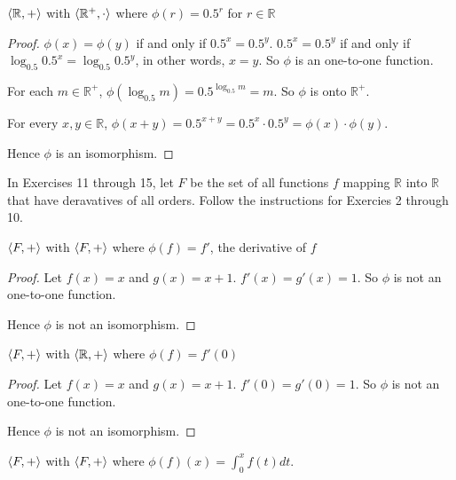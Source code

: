 \begin{exercise}
    $\left\langle{\mathbb{R}, +}\right\rangle$ with $\left\langle{\mathbb{R}^{+},\cdot}\right\rangle$ where $\phi(r) = {0.5}^{r}$ for $r\in\mathbb{R}$
\end{exercise}

\begin{proof}
    $\phi(x) = \phi(y)$ if and only if ${0.5}^{x} = {0.5}^{y}$. ${0.5}^{x} = {0.5}^{y}$ if and only if $\log_{0.5}{0.5}^{x} = \log_{0.5}{0.5}^{y}$, in other words, $x = y$. So $\phi$ is an one-to-one function.

    For each $m\in\mathbb{R}^{+}$, $\phi(\log_{0.5}m) = {0.5}^{\log_{0.5}m} = m$. So $\phi$ is onto $\mathbb{R}^{+}$.

    For every $x, y\in\mathbb{R}$, $\phi(x + y) = {0.5}^{x+y} = {0.5}^{x}\cdot{0.5}^{y} = \phi(x)\cdot\phi(y)$.

    Hence $\phi$ is an isomorphism.
\end{proof}

In Exercises 11 through 15, let $F$ be the set of all functions $f$ mapping $\mathbb{R}$ into $\mathbb{R}$ that have deravatives of all orders. Follow the instructions for Exercies 2 through 10.

\begin{exercise}
    $\left\langle{F,+}\right\rangle$ with $\left\langle{F,+}\right\rangle$ where $\phi(f) = f'$, the derivative of $f$
\end{exercise}

\begin{proof}
    Let $f(x) = x$ and $g(x) = x + 1$. $f'(x) = g'(x) = 1$. So $\phi$ is not an one-to-one function.

    Hence $\phi$ is not an isomorphism.
\end{proof}

\begin{exercise}
    $\left\langle{F, +}\right\rangle$ with $\left\langle{\mathbb{R}, +}\right\rangle$ where $\phi(f) = f'(0)$
\end{exercise}

\begin{proof}
    Let $f(x) = x$ and $g(x) = x + 1$. $f'(0) = g'(0) = 1$. So $\phi$ is not an one-to-one function.

    Hence $\phi$ is not an isomorphism.
\end{proof}

\begin{exercise}
    $\left\langle{F,+}\right\rangle$ with $\left\langle{F,+}\right\rangle$ where $\phi(f)(x) = \int^{x}_{0}f(t)dt$.
\end{exercise}

